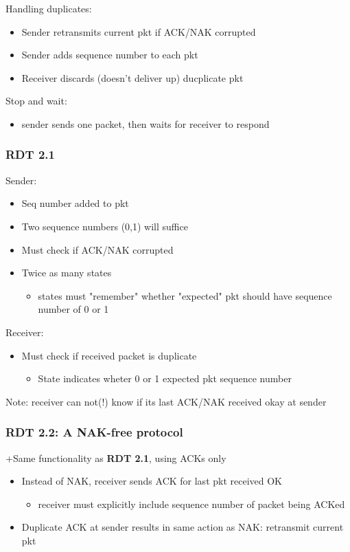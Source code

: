 \documentclass[11pt]{article}
\begin{document}
Handling duplicates:
\begin{itemize}
\item Sender retransmits current pkt if ACK/NAK corrupted
\item Sender adds sequence number to each pkt
\item Receiver discards (doesn't deliver up) ducplicate pkt
\end{itemize}

Stop and wait:
\begin{itemize}
\item sender sends one packet, then waits for receiver to respond
\end{itemize}

\subsubsection{RDT 2.1}
\label{sec:orgaf2e116}
Sender:
\begin{itemize}
\item Seq number added to pkt
\item Two sequence numbers (0,1) will suffice
\item Must check if ACK/NAK corrupted
\item Twice as many states
\begin{itemize}
\item states must "remember" whether "expected" pkt should have sequence
number of 0 or 1
\end{itemize}
\end{itemize}

Receiver: 
\begin{itemize}
\item Must check if received packet is duplicate
\begin{itemize}
\item State indicates wheter 0 or 1 expected pkt sequence number
\end{itemize}
\end{itemize}

Note: receiver can not(!) know if its last ACK/NAK received okay at
sender 

\subsubsection{RDT 2.2: A NAK-free protocol}
\label{sec:org69b8957}

+Same functionality as \textbf{RDT 2.1}, using ACKs only 
\begin{itemize}
\item Instead of NAK, receiver sends ACK for last pkt received OK
\begin{itemize}
\item receiver must explicitly include sequence number of packet being
ACKed
\end{itemize}
\item Duplicate ACK at sender results in same action as NAK: retransmit
current pkt
\end{itemize}
\end{document}
